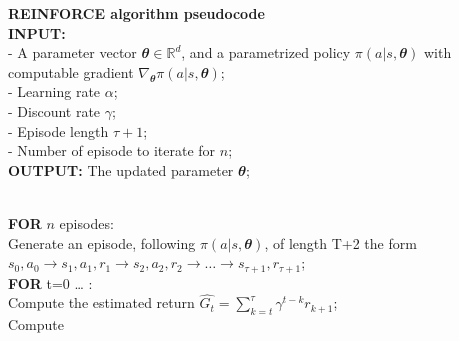 \documentclass[
  letterpaper,
]{report}
\theoremstyle{plain}
\theoremstyle{definition}
\theoremstyle{definition}
\theoremstyle{remark}
\begin{document}
\textbf{REINFORCE algorithm pseudocode}\\
\textbf{INPUT:}\\
- A parameter vector \(\mathbfit{\theta} \in\mathbb{R}^d\), and a
parametrized policy \(\pi(a|s,\mathbfit{\theta})\) with computable
gradient \(\nabla_{\mathbfit{\theta}} \pi(a|s,\mathbfit{\theta})\);\\
- Learning rate \(\alpha\);\\
- Discount rate \(\gamma\);\\
- Episode length \(\tau+1\);\\
- Number of episode to iterate for \(n\);\\
\textbf{OUTPUT:} The updated parameter \(\mathbfit{\theta}\);\\
\strut \\
\textbf{FOR} \(n\) episodes:\\
\hspace*{0.333em}\hspace*{0.333em}\hspace*{0.333em}\hspace*{0.333em}\hspace*{0.333em}\hspace*{0.333em}Generate
an episode, following \(\pi(a|s,\mathbfit{\theta})\), of length T+2 the
form
\(s_0,a_0 \to s_1,a_1,r_1 \to s_2,a_2,r_2 \to \dots \to s_{\tau+1}, r_{\tau+1}\);\\
\hspace*{0.333em}\hspace*{0.333em}\hspace*{0.333em}\hspace*{0.333em}\hspace*{0.333em}\hspace*{0.333em}\textbf{FOR}
t=0 \ldots{} \tau:\\
\hspace*{0.333em}\hspace*{0.333em}\hspace*{0.333em}\hspace*{0.333em}\hspace*{0.333em}\hspace*{0.333em}\hspace*{0.333em}\hspace*{0.333em}\hspace*{0.333em}\hspace*{0.333em}Compute
the estimated return
\(\hat{G_t} = \sum_{k=t}^\tau \gamma^{t-k}r_{k+1}\);\\
\hspace*{0.333em}\hspace*{0.333em}\hspace*{0.333em}\hspace*{0.333em}\hspace*{0.333em}\hspace*{0.333em}\hspace*{0.333em}\hspace*{0.333em}\hspace*{0.333em}\hspace*{0.333em}Compute
\end{document}
